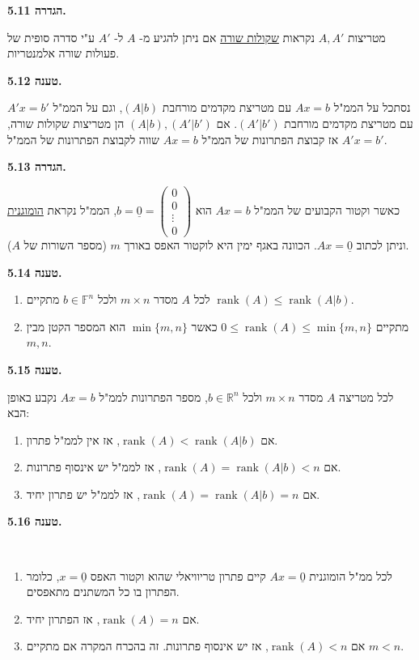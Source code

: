 \documentclass[12pt]{report}
\theoremstyle{plain}
\theoremstyle{definition}
\newcommand{\R}{\mathbb{R}}
\newcommand{\F}{\mathbb{F}}
\DeclareMathOperator{\rank}{rank}
\newcommand{\0}{\mathbf{0}}
\begin{document}
\noindent\textbf{הגדרה 5.11.}

מטריצות 
$A,A'$
נקראות 
\underline{שקולות שורה}
אם ניתן להגיע מ-
$A$
ל-
$A'$
ע"י סדרה סופית של פעולות שורה אלמנטריות.
\bigskip
\bigskip

\noindent\textbf{טענה 5.12.}

נסתכל על הממ"ל
$Ax=b$
עם מטריצת מקדמים מורחבת
$(A|b)$, 
וגם על הממ"ל
$A'x=b'$
עם מטריצת מקדמים מורחבת
$(A'|b')$.
אם
$(A|b),(A'|b')$
הן מטריצות שקולות שורה,
אז קבוצת הפתרונות של הממ"ל
$Ax=b$
שווה לקבוצת הפתרונות של הממ"ל
$A'x=b'$.
\bigskip
\bigskip

\noindent\textbf{הגדרה 5.13.}

כאשר וקטור הקבועים של הממ"ל 
$Ax=b$
הוא
$b=\underline{0}=\begin{pmatrix}0\\
0\\
\vdots\\
0
\end{pmatrix}$,
הממ"ל נקראת
\underline{הומוגנית}
וניתן לכתוב $Ax=\underline{0}$.
הכוונה באגף ימין היא לוקטור האפס באורך
$m$ (מספר השורות של $A$).
\bigskip
\bigskip

\noindent\textbf{טענה 5.14.}

\begin{enumerate}[label=\alph*.]
\item
לכל
$A$
מסדר
$m\times n$
ולכל
$b\in\F^n$
מתקיים
$\rank(A)\leq\rank(A|b)$.


\item 
מתקיים
$0\leq\rank(A)\leq\min\{m,n\}$
כאשר
$\min\{m,n\}$
הוא המספר הקטן מבין 
$m,n$.


\end{enumerate}
\bigskip
\bigskip

\noindent\textbf{טענה 5.15.}

לכל מטריצה
$A$
מסדר
$m\times n$
ולכל 
$b\in\R^n$,
מספר הפתרונות לממ"ל
$Ax=b$
נקבע באופן הבא:
\begin{enumerate}[label=\alph*.]
\item
אם
$\rank(A)<\rank(A|b)$,
אז אין לממ"ל פתרון.


\item
אם
$\rank(A)=\rank(A|b)<n$,
אז לממ"ל יש אינסוף פתרונות.


\item
אם
$\rank(A)=\rank(A|b)=n$,
אז לממ"ל יש פתרון יחיד.


\end{enumerate}
\bigskip
\bigskip

\noindent\textbf{טענה 5.16.}

\label{prop:homogeneous}\
\begin{enumerate}[label=\alph*.]
\item
לכל ממ"ל הומוגנית 
$Ax=\underline{0}$
קיים פתרון טריוויאלי שהוא וקטור
האפס
$x=\underline{0}$,
כלומר הפתרון בו כל המשתנים מתאפסים.


\item
אם
$\rank(A)=n$,
אז הפתרון יחיד.


\item
אם
$\rank(A)<n$,
אז יש אינסוף פתרונות. זה בהכרח המקרה אם מתקיים
$m<n$.


\end{enumerate}
\bigskip
\bigskip
\end{document}
